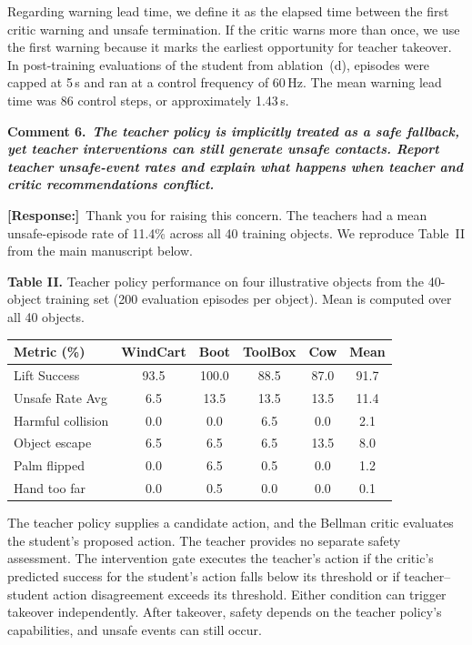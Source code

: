 \documentclass[11pt]{article}
\newcommand{\response}{\par\smallskip\noindent\textcolor{responseblue}{\textbf{[Response:]}}\ }
\newcounter{reviewcomment}
\newcommand{\reviewcommentlabel}[2]{%
  \refstepcounter{reviewcomment}
  \par\medskip
  \noindent\colorbox{draftgray}{%
    \parbox{\dimexpr\linewidth-2\fboxsep\relax}{%
      \textbf{#1.}\ \textbf{\itshape #2}%
    }%
  }\par\smallskip
}
\begin{document}
Regarding warning lead time, we define it as the elapsed time between the
first critic warning and unsafe termination. If the critic warns more than once, we use
the first warning because it marks the earliest opportunity for teacher
takeover. In post-training evaluations of the student from ablation~(d),
episodes were capped at 5\,s and ran at a control frequency of 60\,Hz.
The mean warning lead time was 86 control steps, or approximately 1.43\,s.

\noindent\begin{minipage}{\linewidth}
\reviewcommentlabel{Comment 6}{The teacher policy is implicitly treated as a
safe fallback, yet teacher interventions can still generate unsafe contacts.
Report teacher unsafe-event rates and explain what happens when teacher and
critic recommendations conflict.}

\response Thank you for raising this concern. The teachers had a mean
unsafe-episode rate of 11.4\% across all 40 training objects. We reproduce
Table~II from the main manuscript below.

\begin{center}
\begin{minipage}{0.8\linewidth}
\small
\textbf{Table II.} Teacher policy performance on four illustrative objects from the
40-object training set (200 evaluation episodes per object). Mean is computed
over all 40 objects.
\par\smallskip
\centering
\begin{tabular}{l|cccc|c}
\hline
Metric (\%) & WindCart & Boot & ToolBox & Cow &
\textbf{Mean} \\
\hline
Lift Success         & 93.5 & 100.0 & 88.5 & 87.0 & 91.7 \\
Unsafe Rate Avg      & 6.5   & 13.5  & 13.5 & 13.5 & 11.4 \\
Harmful collision    & 0.0   & 0.0   & 6.5  & 0.0  & 2.1 \\
Object escape        & 6.5   & 6.5   & 6.5  & 13.5 & 8.0 \\
Palm flipped         & 0.0   & 6.5   & 0.5  & 0.0  & 1.2 \\
Hand too far         & 0.0   & 0.5   & 0.0  & 0.0  & 0.1 \\
\hline
\end{tabular}
\end{minipage}
\end{center}

The teacher policy supplies a candidate action, and the Bellman critic
evaluates the student's proposed action. The teacher provides no separate
safety assessment. The intervention gate executes the teacher's action if
the critic's predicted success for the student's action falls below its
threshold or if teacher--student action disagreement exceeds its threshold.
Either condition can trigger takeover independently. After takeover, safety
depends on the teacher policy's capabilities, and unsafe events can still
occur.
\end{minipage}\par
\end{document}
